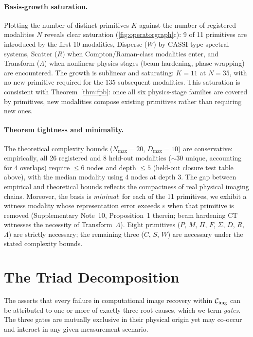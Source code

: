 \paragraph{Basis-growth saturation.}
Plotting the number of distinct primitives $K$ against the number of registered modalities $N$ reveals clear saturation (\cref{fig:operatorgraph}c): 9 of 11 primitives are introduced by the first 10 modalities, Disperse ($W$) by CASSI-type spectral systems, Scatter ($R$) when Compton/Raman-class modalities enter, and Transform ($\Lambda$) when nonlinear physics stages (beam hardening, phase wrapping) are encountered. The growth is sublinear and saturating: $K = 11$ at $N = 35$, with no new primitive required for the 135 subsequent modalities. This saturation is consistent with Theorem~\ref{thm:fpb}: once all six physics-stage families are covered by primitives, new modalities compose existing primitives rather than requiring new ones.

\paragraph{Theorem tightness and minimality.}
The theoretical complexity bounds ($N_{\max} = 20$, $D_{\max} = 10$) are conservative: empirically, all 26 registered and 8 held-out modalities (${\sim}30$ unique, accounting for 4 overlaps) require $\leq 6$ nodes and depth $\leq 5$ (held-out closure test table above), with the median modality using 4 nodes at depth 3. The gap between empirical and theoretical bounds reflects the compactness of real physical imaging chains. Moreover, the basis is \emph{minimal}: for each of the 11 primitives, we exhibit a witness modality whose representation error exceeds $\varepsilon$ when that primitive is removed (Supplementary Note~10, Proposition~1 therein; beam hardening CT witnesses the necessity of Transform~$\Lambda$). Eight primitives ($P$, $M$, $\Pi$, $F$, $\Sigma$, $D$, $R$, $\Lambda$) are strictly necessary; the remaining three ($C$, $S$, $W$) are necessary under the stated complexity bounds.



\section*{The Triad Decomposition}

The \triad{} asserts that every failure in computational image recovery within $\mathcal{C}_{\mathrm{img}}$ can be attributed to one or more of exactly three root causes, which we term \emph{gates}. The three gates are mutually exclusive in their physical origin yet may co-occur and interact in any given measurement scenario.

